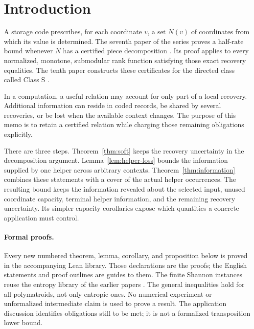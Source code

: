 \section{Introduction}\label{sec:introduction}

A storage code prescribes, for each coordinate $v$, a set $N(v)$ of
coordinates from which its value is determined. The seventh paper of
the series proves a half-rate bound whenever $N$ has a certified piece
decomposition \cite{SeventhPaper2026}. Its proof applies to every
normalized, monotone, submodular rank function satisfying those exact
recovery equalities. The tenth paper constructs these certificates for
the directed class called Class S \cite{TenthPaper2026}.

In a computation, a useful relation may account for only part of a local
recovery. Additional information can reside in coded records, be shared
by several recoveries, or be lost when the available context changes.
The purpose of this memo is to retain a certified relation while charging
those remaining obligations explicitly.

There are three steps. Theorem~\ref{thm:soft} keeps the recovery uncertainty
in the decomposition argument. Lemma~\ref{lem:helper-loss} bounds the
information supplied by one helper across arbitrary contexts.
Theorem~\ref{thm:information} combines these statements with a cover of
the actual helper occurrences. The resulting bound keeps the information
revealed about the selected input, unused coordinate capacity, terminal
helper information, and the remaining recovery uncertainty. Its simpler
capacity corollaries expose which quantities a concrete application must
control.

\paragraph{Formal proofs.}
Every new numbered theorem, lemma, corollary, and proposition below is
proved in the accompanying Lean library. Those declarations are the
proofs; the English statements and proof outlines are guides to them.
The finite Shannon instances reuse the entropy library of the earlier
papers \cite{SecondPaper2026,FourthPaper2026}. The general inequalities
hold for all polymatroids, not only entropic ones. No numerical experiment
or unformalized intermediate claim is used to prove a result. The
application discussion identifies obligations still to be met; it is not
a formalized transposition lower bound.

